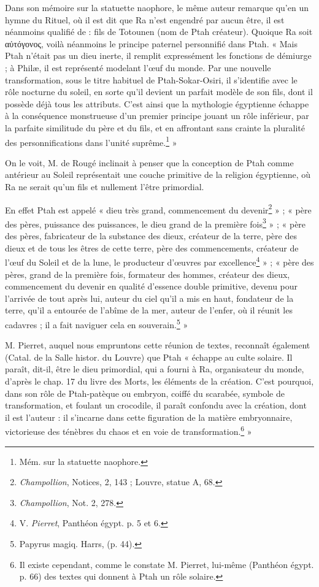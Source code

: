 \documentclass[a4paper, 11pt, oneside]{article}
\begin{document}
Dans son mémoire sur la statuette naophore, le même auteur remarque qu'en un hymne du Rituel, où il est dit que Ra n'est engendré par aucun être, il est néanmoins qualifié de : fils de Totounen (nom de Ptah créateur). Quoique Ra soit αὐτόγονος, voilà néanmoins le principe paternel personnifié dans Ptah. « Mais Ptah n'était pas un dieu inerte, il remplit expressément les fonctions de démiurge ; à Philæ, il est représenté modelant l'œuf du monde. Par une nouvelle transformation, sous le titre habituel de Ptah-Sokar-Osiri, il s'identifie avec le rôle nocturne du soleil, en sorte qu'il devient un parfait modèle de son fils, dont il possède déjà tous les attributs. C'est ainsi que la mythologie égyptienne échappe à la conséquence monstrueuse d'un premier principe jouant un rôle inférieur, par la parfaite similitude du père et du fils, et en affrontant sans crainte la pluralité des personnifications dans l'unité suprême.\footnote{Mém. sur la statuette naophore.} »

On le voit, M. de Rougé inclinait à penser que la conception de Ptah comme antérieur au Soleil représentait une couche primitive de la religion égyptienne, où Ra ne serait qu'un fils et nullement l'être primordial.

En effet Ptah est appelé « dieu très grand, commencement du devenir\footnote{\emph{Champollion}, Notices, 2, 143 ; Louvre, statue A, 68.} » ; « père des pères, puissance des puissances, le dieu grand de la première fois\footnote{\emph{Champollion}, Not. 2, 278.} » ; « père des pères, fabricateur de la substance des dieux, créateur de la terre, père des dieux et de tous les êtres de cette terre, père des commencements, créateur de l'œuf du Soleil et de la lune, le producteur d'œuvres par excellence\footnote{V. \emph{Pierret}, Panthéon égypt. p. 5 et 6.} » ; « père des pères, grand de la première fois, formateur des hommes, créateur des dieux, commencement du devenir en qualité d'essence double primitive, devenu pour l'arrivée de tout après lui, auteur du ciel qu'il a mis en haut, fondateur de la terre, qu'il a entourée de l'abîme de la mer, auteur de l'enfer, où il réunit les cadavres ; il a fait naviguer cela en souverain.\footnote{Papyrus magiq. Harrs, (p. 44).} »

M. Pierret, auquel nous empruntons cette réunion de textes, reconnaît également (Catal. de la Salle histor. du Louvre) que Ptah « échappe au culte solaire. Il paraît, dit-il, être le dieu primordial, qui a fourni à Ra, organisateur du monde, d'après le chap. 17 du livre des Morts, les éléments de la création. C'est pourquoi, dans son rôle de Ptah-patèque ou embryon, coiffé du scarabée, symbole de transformation, et foulant un crocodile, il paraît confondu avec la création, dont il est l'auteur : il s'incarne dans cette figuration de la matière embryonnaire, victorieuse des ténèbres du chaos et en voie de transformation.\footnote{Il existe cependant, comme le constate M. Pierret, lui-même (Panthéon égypt. p. 66) des textes qui donnent à Ptah un rôle solaire.} »
\end{document}
